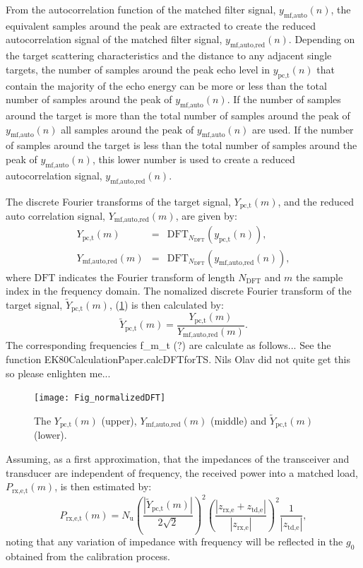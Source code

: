 \documentclass[preprint,12pt,TurnOnLineNumbers]{JASAnew}
\newcommand{\samplesymt}{n}
\newcommand{\samplesymf}{m}
\newcommand{\nchannels}{N_{\textrm{u}}}
\newcommand{\zrxe}{z_{\textrm{rx,e}}}
\newcommand{\ztde}{z_{\textrm{td,e}}}
\newcommand{\ypctarget}{y_{\textrm{pc,t}}}
\newcommand{\ymfauto}{y_{\textrm{mf,auto}}}
\newcommand{\ymfautored}{y_{\textrm{mf,auto,red}}}
\newcommand{\ypctargetf}{Y_{\textrm{pc,t}}}
\newcommand{\ypctargetnormf}{\tilde{Y}_{\textrm{pc,t}}}
\newcommand{\ymfautoredf}{Y_{\textrm{mf,auto,red}}}
\newcommand{\prxetf}{P_{\textrm{rx,e,t}}}
\newcommand{\gainzero}{g_0}
\newcommand{\dft}{\textrm{DFT}}
\newcommand{\ndft}{{N_{\textrm{DFT}}}}
\begin{document}
From the autocorrelation function of the matched filter signal, $\ymfauto(\samplesymt)$, the equivalent samples around the peak are extracted to create the reduced autocorrelation signal of the matched filter signal, $\ymfautored(\samplesymt)$. Depending on the target scattering characteristics and the distance to any adjacent single targets, the number of samples around the peak echo level in $\ypctarget(\samplesymt)$ that contain the majority of the echo energy can be more or less than the total number of samples around the peak of $\ymfauto(\samplesymt)$. If the number of samples around the target is more than the total number of samples around the peak of $\ymfauto(\samplesymt)$ all samples around the peak of $\ymfauto(\samplesymt)$ are used. If the number of samples around the target is less than the total number of samples around the peak of $\ymfauto(\samplesymt)$, this lower number is used to create a reduced autocorrelation signal, $\ymfautored(\samplesymt)$.

The discrete Fourier transforms of the target signal, $\ypctargetf(\samplesymf)$, and the reduced auto correlation signal, $\ymfautoredf(\samplesymf)$, are given by:
\begin{eqnarray}
\label{eq:DFT_Target_Auto}
\ypctargetf(\samplesymf) & = & \dft_\ndft(\ypctarget(\samplesymt)),\\
\ymfautoredf(\samplesymf) & = & \dft_\ndft(\ymfautored(\samplesymt)),
\end{eqnarray}
where $\dft$ indicates the Fourier transform of length $\ndft$ and $\samplesymf$ the sample index in the frequency domain.
The nomalized discrete Fourier transform of the target signal, $\ypctargetnormf(\samplesymf)$, (\ref{fi:SED}) is then calculated by: 
%
\begin{equation}
\label{eq:DFT_Target_Auto_Norm}
\ypctargetnormf(\samplesymf) = \frac{\ypctargetf(\samplesymf)} {\ymfautoredf(\samplesymf)}.
\end{equation}
%
The corresponding frequencies f\_m\_t (?) are calculate as follows... See the function EK80CalculationPaper.calcDFTforTS. Nils Olav did not quite get this so please enlighten me...
%
\begin{figure}
\texttt{[image: Fig\_normalizedDFT]}
\caption{\label{fi:SED}The $\ypctargetf(\samplesymf)$ (upper), $\ymfautoredf(\samplesymf)$ (middle) and $\ypctargetnormf(\samplesymf)$ (lower).}
\end{figure}


Assuming, as a first approximation, that the impedances of the transceiver and transducer are independent of frequency, the received power into a matched load, $\prxetf(\samplesymf)$, is then estimated by:
\begin{equation}
\label{eq:prx_FFT_target}
\prxetf(\samplesymf) = \nchannels\left( \frac{|\ypctargetnormf(\samplesymf)|}{2\sqrt{2}} \right)^2 
\left( \frac{|\zrxe+\ztde|}{|\zrxe|}\right)^2 \frac{1}{|\ztde|}, %
\end{equation}
%
noting that any variation of impedance with frequency will be reflected in the $\gainzero$ obtained from the calibration process.
\end{document}
